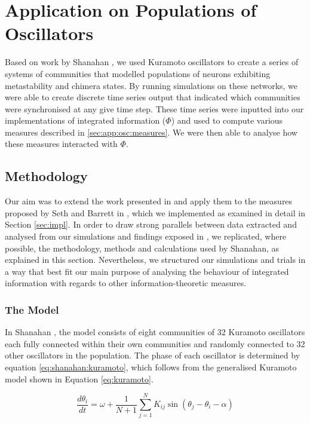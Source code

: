 \documentclass[a4paper,11pt]{article}
\begin{document}
\section{Application on Populations of Oscillators}
\label{MSUKO}

Based on work by Shanahan \cite{Shanahan2010}, we used Kuramoto oscillators to create a series of systems of communities that modelled populations of neurons exhibiting metastability and chimera states. By running simulations on these networks, we were able to create discrete time series output that indicated which communities were synchronised at any give time step. These time series were inputted into our implementations of integrated information ($\Phi$) and used to compute various measures described in \ref{sec:app:osc:measures}. We were then able to analyse how these measures interacted with $\Phi$.

\subsection{Methodology}
\label{sec:osc:methods}
Our aim was to extend the work presented in \cite{Shanahan2010} and apply them to the measures proposed by Seth and Barrett in \cite{Barrett2011}, which we implemented as examined in detail in Section \ref{sec:impl}. In order to draw strong parallels between data extracted and analysed from our simulations and findings exposed in \cite{Shanahan2010}, we replicated, where possible, the methodology, methods and calculations used by Shanahan, as explained in this section. Nevertheless, we structured our simulations and trials in a way that best fit our main purpose of analysing the behaviour of integrated information with regards to other information-theoretic measures.

\subsubsection{The Model}
\label{sec:osc:mod}

In Shanahan \cite{Shanahan2010}, the model consists of eight communities of 32 Kuramoto oscillators each fully connected within their own communities and randomly connected to 32 other oscillators in the population. The phase of each oscillator is determined by equation \ref{eq:shanahan:kuramoto}, which follows from the generalised Kuramoto model shown in Equation \ref{eq:kuramoto}. 

\begin{equation} \label{eq:shanahan:kuramoto}
\frac{d\theta_i}{dt} = \omega + \frac{1}{N + 1} \sum_{j=1}^{N} K_{ij} \sin(\theta_j - \theta_i - \alpha)
\end{equation}
\end{document}
